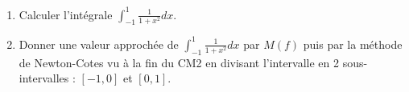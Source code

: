 \begin{enumerate}
{\begin{solution}
        Essayons avec $f(x) = x^4$ : 
        \[
        \int_{-1}^1 x^4 dx = \frac{2}{5}
        \]
        \[
        \frac{4}{3} \left(-\frac{1}{2}\right)^4 + \left(-\frac{2}{3}\right) 0 + \frac{4}{3} \left(\frac{1}{2}\right)^4 = \frac{1}{6}
        \]
        La formule ne fonctionne pas pour les polynômes de degré 4.
    \end{solution}
    }{}
    \item Calculer l'intégrale $\int_{-1}^1 \frac{1}{1+x^2} d x$.
    \item Donner une valeur approchée de $\int_{-1}^1 \frac{1}{1+x^2} d x$ par $M(f)$ puis par la méthode de Newton-Cotes vu à la fin du CM2 en divisant l'intervalle en 2 sous-intervalles : $[-1,0]$ et $[0,1]$.
\end{enumerate}




